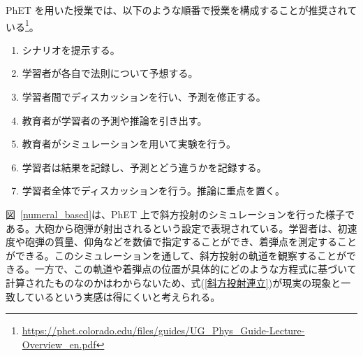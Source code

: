 PhET を用いた授業では、以下のような順番で授業を構成することが推奨されている\footnote{\url{https://phet.colorado.edu/files/guides/UG_Phys_Guide-Lecture-Overview_en.pdf}}。
\begin{enumerate}
  \item シナリオを提示する。
  \item 学習者が各自で法則について予想する。
  \item 学習者間でディスカッションを行い、予測を修正する。
  \item 教育者が学習者の予測や推論を引き出す。
  \item 教育者がシミュレーションを用いて実験を行う。
  \item 学習者は結果を記録し、予測とどう違うかを記録する。
  \item 学習者全体でディスカッションを行う。推論に重点を置く。
\end{enumerate}

図~\ref{numeral_based}は、PhET 上で斜方投射のシミュレーションを行った様子である。大砲から砲弾が射出されるという設定で表現されている。学習者は、初速度や砲弾の質量、仰角などを数値で指定することができ、着弾点を測定することができる。このシミュレーションを通して、斜方投射の軌道を観察することができる。一方で、この軌道や着弾点の位置が具体的にどのような方程式に基づいて計算されたものなのかはわからないため、式(\ref{斜方投射連立})が現実の現象と一致しているという実感は得にくいと考えられる。

